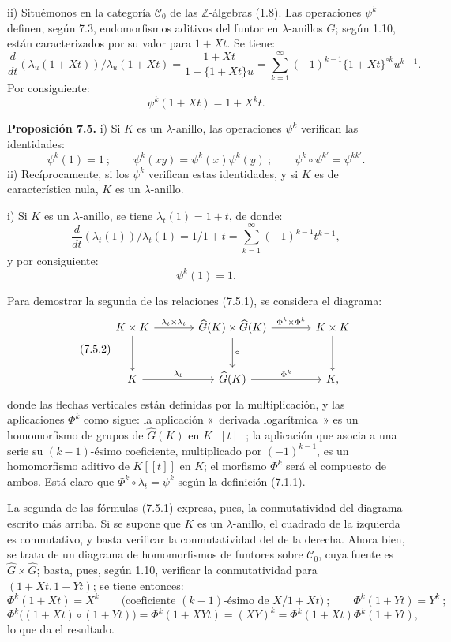 ii) Situémonos en la categoría \(\mathcal C_0\) de las \(\mathbb Z\)-álgebras (1.8). Las operaciones \(\psi^k\) definen, según 7.3, endomorfismos aditivos del funtor en \(\lambda\)-anillos \(G\); según 1.10, están caracterizados por su valor para \(1+Xt\). Se tiene:
\[
  \frac{d}{dt}(\lambda_u(1+Xt))/\lambda_u(1+Xt)
  =
  \frac{1+Xt}{\underline 1+\{1+Xt\}u}
  =
  \sum_{k=1}^{\infty}(-1)^{k-1}\{1+Xt\}^{\circ k}u^{k-1}.
\]
Por consiguiente:
\begin{equation}\tag{7.4.1}
  \psi^k(1+Xt)=1+X^k t.
\end{equation}

\textbf{Proposición 7.5.} i) Si \(K\) es un \(\lambda\)-anillo, las operaciones \(\psi^k\) verifican las identidades:
\begin{equation}\tag{7.5.1}
  \psi^k(1)=1~;\qquad
  \psi^k(xy)=\psi^k(x)\psi^k(y)~;\qquad
  \psi^k\circ\psi^{k'}=\psi^{kk'}.
\end{equation}
ii) Recíprocamente, si los \(\psi^k\) verifican estas identidades, y si \(K\) es de característica nula, \(K\) es un \(\lambda\)-anillo.

i) Si \(K\) es un \(\lambda\)-anillo, se tiene \(\lambda_t(1)=1+t\), de donde:
\[
  \frac{d}{dt}(\lambda_t(1))/\lambda_t(1)
  =
  1/1+t
  =
  \sum_{k=1}^{\infty}(-1)^{k-1}t^{k-1},
\]
y por consiguiente:
\[
  \psi^k(1)=1.
\]

Para demostrar la segunda de las relaciones (7.5.1), se considera el diagrama:
\begin{equation}\tag{7.5.2}
\begin{tikzcd}[column sep=large,row sep=large]
K\times K \arrow[r,"\lambda_t\times\lambda_t"] \arrow[d] &
\widehat G(K)\times\widehat G(K) \arrow[r,"\Phi^k\times\Phi^k"] \arrow[d,"\circ"] &
K\times K \arrow[d]\\
K \arrow[r,"\lambda_t"] &
\widehat G(K) \arrow[r,"\Phi^k"] &
K ,
\end{tikzcd}
\end{equation}
donde las flechas verticales están definidas por la multiplicación, y las aplicaciones \(\Phi^k\) como sigue: la aplicación «~derivada logarítmica~» es un homomorfismo de grupos de \(\widehat G(K)\) en \(K[[t]]\); la aplicación que asocia a una serie su \((k-1)\)-ésimo coeficiente, multiplicado por \((-1)^{k-1}\), es un homomorfismo aditivo de \(K[[t]]\) en \(K\); el morfismo \(\Phi^k\) será el compuesto de ambos. Está claro que \(\Phi^k\circ\lambda_t=\psi^k\) según la definición (7.1.1).

La segunda de las fórmulas (7.5.1) expresa, pues, la conmutatividad del diagrama escrito más arriba. Si se supone que \(K\) es un \(\lambda\)-anillo, el cuadrado de la izquierda es conmutativo, y basta verificar la conmutatividad del de la derecha. Ahora bien, se trata de un diagrama de homomorfismos de funtores sobre \(\mathcal C_0\), cuya fuente es \(\widehat G\times\widehat G\); basta, pues, según 1.10, verificar la conmutatividad para \((1+Xt,1+Yt)\); se tiene entonces:
\[
  \Phi^k(1+Xt)=X^k\qquad\bigl(\text{coeficiente \((k-1)\)-ésimo de }X/1+Xt\bigr)~;\qquad
  \Phi^k(1+Yt)=Y^k~;
\]
\[
  \Phi^k\bigl((1+Xt)\circ(1+Yt)\bigr)
  =
  \Phi^k(1+XYt)
  =
  (XY)^k
  =
  \Phi^k(1+Xt)\Phi^k(1+Yt),
\]
lo que da el resultado.

